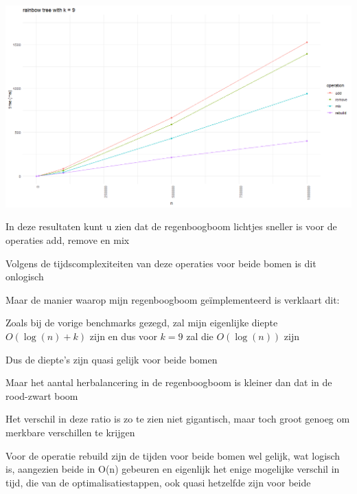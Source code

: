\documentclass{article}
\begin{document}
\vspace{0.2cm}

\includegraphics[width=1\textwidth]{benchmark_rainbow_vs_redblack_1.png}

\vspace{0.2cm}

\large

In deze resultaten kunt u zien dat de regenboogboom lichtjes sneller is voor de operaties add, remove en mix

\newpage

Volgens de tijdscomplexiteiten van deze operaties voor beide bomen is dit onlogisch

Maar de manier waarop mijn regenboogboom geïmplementeerd is verklaart dit:

Zoals bij de vorige benchmarks gezegd, zal mijn eigenlijke diepte $O(\log(n) + k)$ zijn en dus voor $k = 9$ zal die $O(\log(n))$ zijn

Dus de diepte's zijn quasi gelijk voor beide bomen

Maar het aantal herbalancering in de regenboogboom is kleiner dan dat in de rood-zwart boom

Het verschil in deze ratio is zo te zien niet gigantisch, maar toch groot genoeg om merkbare verschillen te krijgen

\vspace{0.2cm}

Voor de operatie rebuild zijn de tijden voor beide bomen wel gelijk, wat logisch is, aangezien beide in O(n) gebeuren en eigenlijk het enige mogelijke verschil in tijd, die van de optimalisatiestappen, ook quasi hetzelfde zijn voor beide
\end{document}
